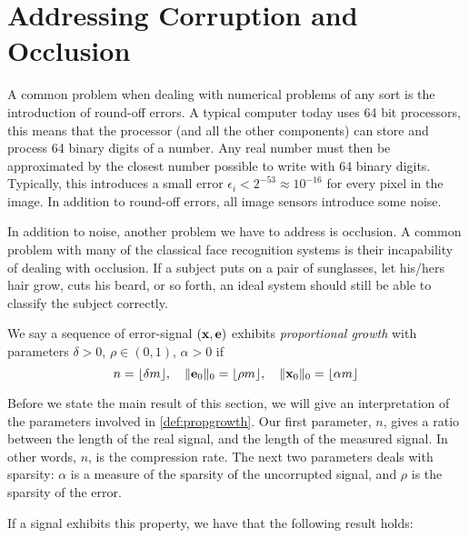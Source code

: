 \section{Addressing Corruption and Occlusion}
A common problem when dealing with numerical problems of any sort is the introduction of round-off errors. A typical computer today uses 64 bit processors, this means that the processor (and all the other components) can store and process 64 binary digits of a number. Any real number must then be approximated by the closest number possible to write with 64 binary digits. Typically, this introduces a small error $ \epsilon_{i} < 2^{-53} \approx 10^{-16} $ for every pixel in the image. In addition to round-off errors, all image sensors introduce some noise. 

In addition to noise, another problem we have to address is occlusion. A common problem with many of the classical face recognition systems is their incapability of dealing with occlusion. If a subject puts on a pair of sunglasses, let his/hers hair grow, cuts his beard, or so forth, an ideal system should still be able to classify the subject correctly.


\begin{definition}
	\label{def:propgrowth}
	We say a sequence of error-signal $ (\mathbf{x}, \mathbf{e}) $ exhibits \textit{proportional growth} with parameters $ \delta > 0 $, $ \rho \in (0,1) $, $ \alpha > 0 $ if	
	\[
		n = \lfloor \delta m \rfloor,\quad \lVert\mathbf{e}_{0}\rVert_{0} = \lfloor \rho m \rfloor, \quad \lVert\mathbf{x}_{0}\rVert_{0} = \lfloor \alpha m \rfloor
	\]
\end{definition}

Before we state the main result of this section, we will give an interpretation of the parameters involved in \cref{def:propgrowth}. Our first parameter, $ n $, gives a ratio between the length of the real signal, and the length of the measured signal. In other words, $ n $, is the compression rate. The next two parameters deals with sparsity: $ \alpha $ is a measure of the sparsity of the uncorrupted signal, and $ \rho $ is the sparsity of the error. 

If a signal exhibits this property, we have that the following result holds:

